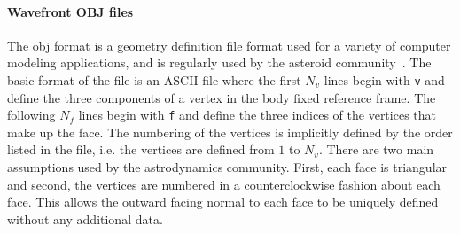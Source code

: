 \paragraph{Wavefront OBJ files}
The \gls{obj} format is a geometry definition file format used for a variety of computer modeling applications, and is regularly used by the asteroid community~\cite{neese2004}.
The basic format of the file is an ASCII file where the first \( N_v\) lines begin with \texttt{v} and define the three components of a vertex in the body fixed reference frame.
The following \( N_f\) lines begin with \texttt{f} and define the three indices of the vertices that make up the face.
The numbering of the vertices is implicitly defined by the order listed in the file, i.e. the vertices are defined from \( 1 \) to \( N_v\).
There are two main assumptions used by the astrodynamics community.
First, each face is triangular and second, the vertices are numbered in a counterclockwise fashion about each face.
This allows the outward facing normal to each face to be uniquely defined without any additional data.

